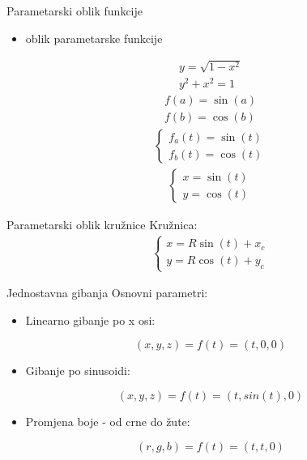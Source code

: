 \documentclass[9pt]{beamer}
\begin{document}
\begin{frame}{Parametarski oblik funkcije}
	\begin{itemize}
		\item oblik parametarske funkcije
	\end{itemize}
	\begin{align*}
		y = \sqrt{1-x^2} \\
		y^2+x^2 = 1
	\end{align*}
	\begin{align*}
		f(a) = \sin(a)\\
		f(b) = \cos(b)
	\end{align*}
	\begin{align*}
		\left \{ \begin{matrix}
			f_a(t) = \sin(t) \\
			f_b(t) = \cos(t)
		\end{matrix} \right.
	\end{align*}
	\begin{align*}
		\left \{ \begin{matrix}
			x = \sin(t) \\
			y = \cos(t)
		\end{matrix} \right.
	\end{align*}
\end{frame}

\begin{frame}{Parametarski oblik kružnice}
	Kružnica:
	\begin{align*}
		\left \{ \begin{matrix}
			x = R\sin(t) + x_c \\
			y = R\cos(t) + y_c
		\end{matrix} \right.
	\end{align*}
\end{frame}	
\begin{frame}{Jednostavna gibanja}
	Osnovni parametri:
	\begin{itemize}
		\item Linearno gibanje po x osi: 
	\end{itemize}
	$$(x,y,z) = f(t) = (t,0,0)$$
	\begin{itemize}
		\item Gibanje po sinusoidi: 
	\end{itemize}
	$$(x,y,z) = f(t) = (t,sin(t),0)$$
	
	\begin{itemize}
		\item Promjena boje  - od crne do žute: 
	\end{itemize}
	$$(r,g,b) = f(t) = (t,t,0)$$
\end{frame}
\end{document}
